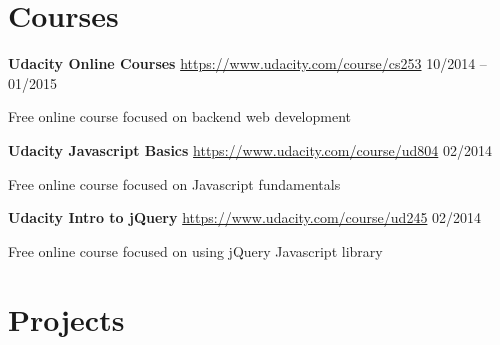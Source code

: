 \documentclass[margin,line]{resume}
\begin{document}
\begin{resume}
    \section{\mysidestyle Courses}

    \textbf{Udacity Online Courses} \url{https://www.udacity.com/course/cs253} \hfill 10/2014 -- 01/2015 \vspace{-3mm}\\\vspace{-1mm}%
      \begin{list2}
       \item Free online course focused on backend web development
      \end{list2}

    \textbf{Udacity Javascript Basics} \url{https://www.udacity.com/course/ud804} \hfill 02/2014 \vspace{-3mm}\\\vspace{-1mm}%
      \begin{list2}
       \item Free online course focused on Javascript fundamentals
      \end{list2}

    \textbf{Udacity Intro to jQuery} \url{https://www.udacity.com/course/ud245} \hfill 02/2014 \vspace{-3mm}\\\vspace{-1mm}%
      \begin{list2}
       \item Free online course focused on using jQuery Javascript library
      \end{list2}

    \section{\mysidestyle Projects}



\end{resume}
\end{document}
